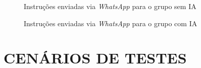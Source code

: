 \documentclass[english,brazilian]{UNISINOSartigo} %
\begin{document}
\begin{figure}[ht]
    \caption{Instruções enviadas via \textit{WhatsApp} para o grupo sem IA}
    \label{fig:instrucoes_sem_ia}
    \centering
    \footnotesize
    \begin{minipage}{.9\textwidth}
        \centering
    \end{minipage}
\end{figure}
\FloatBarrier

\begin{figure}[ht]
    \caption{Instruções enviadas via \textit{WhatsApp} para o grupo com IA}
    \label{fig:instrucoes_com_ia}
    \centering
    \footnotesize
    \begin{minipage}{.9\textwidth}
        \centering
    \end{minipage}
\end{figure}
\FloatBarrier

\section{CENÁRIOS DE TESTES}
\end{document}
